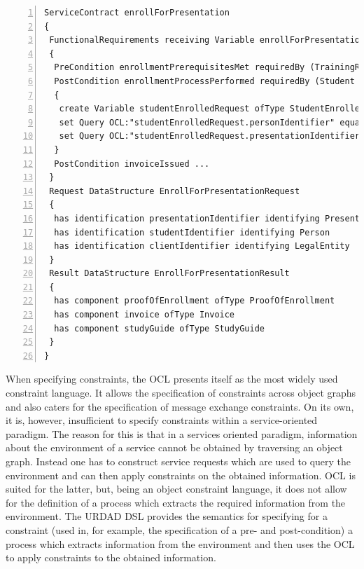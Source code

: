\lstset{language=urdad,caption=Specifying a service contract in the textual URDAD DSL syntax.,label=contractTextSyntax}
\begin{lstlisting}[numbers=left,escapechar=|]
ServiceContract enrollForPresentation
{
 FunctionalRequirements receiving Variable enrollForPresentationRequest ofType EnrollForPresentationRequest
 {
  PreCondition enrollmentPrerequisitesMet requiredBy (TrainingRegulator Student) raises EnrollmentPrerequisitesNotSatisfiedException checks constraint enrollmentPrerequisitesForPresentationMet with ValueOf enrollForPresentationRequest
  PostCondition enrollmentProcessPerformed requiredBy (Student Client TrainingRegulator) ensures constraint studentEnrolledForPresentation          with ValueOf studentEnrolledRequest constructedUsing doSequential
  {
   create Variable studentEnrolledRequest ofType StudentEnrolledRequest
   set Query OCL:"studentEnrolledRequest.personIdentifier" equalTo Query OCL:"enrollForPresentationRequest.personIdentifier"                            
   set Query OCL:"studentEnrolledRequest.presentationIdentifier" equalTo Query OCL:"enrollForPresentationRequest.presentationIdentifier"                            
  }  
  PostCondition invoiceIssued ...
 }            
 Request DataStructure EnrollForPresentationRequest 
 {
  has identification presentationIdentifier identifying Presentation
  has identification studentIdentifier identifying Person
  has identification clientIdentifier identifying LegalEntity         
 }
 Result DataStructure EnrollForPresentationResult 
 {
  has component proofOfEnrollment ofType ProofOfEnrollment
  has component invoice ofType Invoice
  has component studyGuide ofType StudyGuide
 }
}
\end{lstlisting}

When specifying constraints, the OCL presents itself as the most widely used constraint language. It allows the specification of constraints across object graphs and also caters for the specification of message exchange constraints. On its own, it is, however, insufficient to specify constraints within a service-oriented paradigm. The reason for this is that in a services oriented paradigm, information about the environment of a service cannot be obtained by traversing an object graph. Instead one has to construct service requests which are used to query the environment and can then apply constraints on the obtained information. OCL is suited for the latter, but, being an object constraint language, it does not allow for the definition of a process which extracts the required information from the environment. The URDAD DSL provides the semantics for specifying for a constraint (used in, for example, the specification of a pre- and post-condition) a process which extracts information from the environment and then uses the OCL to apply constraints to the obtained information. 

